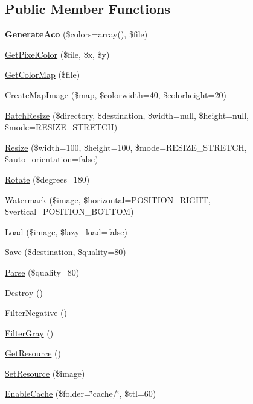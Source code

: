 \subsection*{Public Member Functions}
\begin{DoxyCompactItemize}
\item 
\hypertarget{class_advanced_processor_a7f6abf3ece14da58ccf492ab194a8ec3}{
{\bfseries GenerateAco} (\$colors=array(), \$file)}
\label{class_advanced_processor_a7f6abf3ece14da58ccf492ab194a8ec3}

\item 
\hyperlink{class_advanced_processor_a7db87c55f2344d257a4cb785cd4945ae}{GetPixelColor} (\$file, \$x, \$y)
\item 
\hyperlink{class_advanced_processor_a59b8b78906c35dd1e405ae4cdcdd06ca}{GetColorMap} (\$file)
\item 
\hyperlink{class_advanced_processor_a6774ba25d60b79dd1ea92f906273b530}{CreateMapImage} (\$map, \$colorwidth=40, \$colorheight=20)
\item 
\hyperlink{class_advanced_processor_af247233cba6be6dde043a0fceb7450c2}{BatchResize} (\$directory, \$destination, \$width=null, \$height=null, \$mode=RESIZE\_\-STRETCH)
\item 
\hyperlink{class_image_processor_a741991b58a904e7d360ba248c0635a3a}{Resize} (\$width=100, \$height=100, \$mode=RESIZE\_\-STRETCH, \$auto\_\-orientation=false)
\item 
\hyperlink{class_image_processor_a2022a4c342adae35c0c98bd84b5189ac}{Rotate} (\$degrees=180)
\item 
\hyperlink{class_image_processor_a4467f85d2e8929da1ba99b14b5ced06a}{Watermark} (\$image, \$horizontal=POSITION\_\-RIGHT, \$vertical=POSITION\_\-BOTTOM)
\item 
\hyperlink{class_image_processor_a084ac19ce186da9093c5f3e110613f25}{Load} (\$image, \$lazy\_\-load=false)
\item 
\hyperlink{class_image_processor_a5e84b5fa1a09c453046710cf4a372235}{Save} (\$destination, \$quality=80)
\item 
\hyperlink{class_image_processor_aff78404716b7c12faf48b4d90d86304f}{Parse} (\$quality=80)
\item 
\hyperlink{class_image_processor_af283f640a2de333ced2616be941ee5dd}{Destroy} ()
\item 
\hyperlink{class_image_processor_a5e3a491a7d0b485efa3171b4f0ee4341}{FilterNegative} ()
\item 
\hyperlink{class_image_processor_ab2ad017b33e16bd351ded87dcccdc844}{FilterGray} ()
\item 
\hyperlink{class_image_processor_a02b33fb5a0b2d51c228ad72a745c235f}{GetResource} ()
\item 
\hyperlink{class_image_processor_a3d6489e0bd2240e539582a6f12ccf39e}{SetResource} (\$image)
\item 
\hyperlink{class_image_processor_a41530fad864e3c73788e176fab35ab59}{EnableCache} (\$folder=\char`\"{}cache/\char`\"{}, \$ttl=60)
\end{DoxyCompactItemize}
